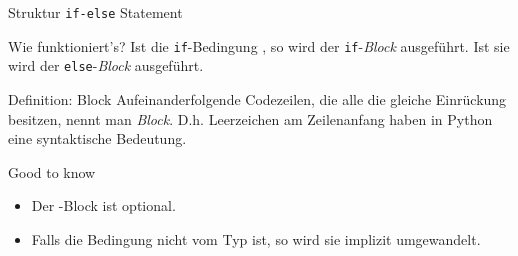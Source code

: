 \begin{frame}


	\renewcommand{\baselinestretch}{1.5}
\begin{block}{Struktur \texttt{if-else} Statement}	
	\vspace{2pt}
\end{block}
\renewcommand{\baselinestretch}{1}

\end{frame}
\begin{frame}
\begin{block}{Wie funktioniert's?}
	\vspace{2pt}
Ist die \texttt{if}-Bedingung , so wird der \texttt{if}-\textit{Block} ausgeführt. Ist sie  wird der \texttt{else}-\textit{Block} ausgeführt. 
\end{block}
\pause

\vspace{10pt}
	\begin{block}{Definition: Block}
		\vspace{2pt}
		Aufeinanderfolgende Codezeilen, die alle die gleiche Einrückung besitzen, nennt man \emph{Block}. 
		D.h. Leerzeichen am Zeilenanfang haben in Python eine syntaktische Bedeutung.  
	\end{block}


\pause 
\vspace{10pt}

\begin{block}{Good to know}
	\begin{itemize}
		\item Der -Block ist optional.
		\item Falls die Bedingung nicht vom Typ  ist, so wird sie implizit umgewandelt.  
	\end{itemize}
\end{block}
\end{frame}

